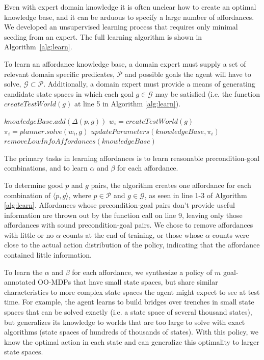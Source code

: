 \documentclass[conference]{IEEEtran}
\begin{document}
Even with expert domain knowledge it is often unclear how to create
an optimal knowledge base, and it can be arduous to specify a 
large number of affordances. We developed an unsupervised learning
process that requires only minimal seeding from an expert.
The full learning algorithm is shown in Algorithm~\ref{alg:learn}.

To learn an affordance knowledge base, a domain 
expert must supply a set of relevant domain specific predicates,
$\mathcal{P}$ and possible goals the agent will have to solve, $\mathcal{G}
\subset \mathcal{P}$. Additionally, a domain expert must provide a means 
of generating candidate state spaces in which each goal $g \in \mathcal{G}$
may be satisfied (i.e. the function $createTestWorld(g)$ at line 5 in Algorithm \ref{alg:learn}).

\begin{algorithm}
  \caption{$learn(\mathcal{P}, \mathcal{G})$}
  \begin{algorithmic}[1]
    \State $knowledgeBase.add(\Delta(p,g))$
    \EndFor
    \State $w_i = createTestWorld(g)$
    \State $\pi_i = planner.solve(w_i, g)$
    \State $updateParameters(knowledgeBase, \pi_i)$
    \EndFor
    \State $removeLowInfoAffordances(knowledgeBase)$
  \end{algorithmic}
  \label{alg:learn}
\end{algorithm}

The primary tasks in learning affordances is to learn reasonable precondition-goal 
combinations, and to learn $\alpha$ and $\beta$ for each affordance. 

To determine good $p$ and $g$ pairs, the algorithm creates one affordance for 
each combination of $\langle p, g \rangle$, where $p \in \mathcal{P}$ and $g
\in \mathcal{G}$, as seen in line 1-3 of Algorithm \ref{alg:learn}. Affordances
whose precondition-goal pairs don't provide useful information are thrown out 
by the function call on line 9, leaving only those affordances with sound 
precondition-goal pairs. We chose to remove affordances with little or no $\alpha$
counts at the end of training, or those whose $\alpha$ counts were close to the 
actual action distribution of the policy, indicating that the affordance contained little 
information.

To learn the $\alpha$ and $\beta$ for each
affordance, we synthesize a policy of $m$ goal-annotated
OO-MDPs that have small state spaces, but share similar characteristics
to more complex state spaces the agent might expect to see at test time.
For example, the agent learns to build bridges over trenches in small state
spaces that can be solved exactly (i.e. a state space of several thousand states), but
generalizes its knowledge to worlds that are too large to solve with exact algorithms
(state spaces of hundreds of thousands of states). With this policy, we know the optimal 
action in each state and can generalize this optimality to larger state spaces.
\end{document}

